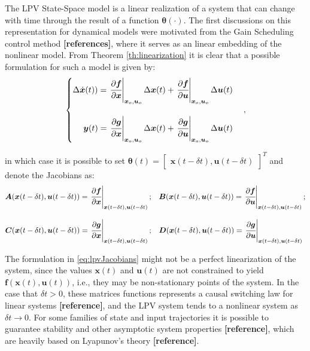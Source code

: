 \documentclass[a4paper,11pt]{book}
\numberwithin{figure}{chapter}
\numberwithin{equation}{chapter}
\numberwithin{table}{chapter}
\theoremstyle{definition}
\begin{document}
The LPV State-Space model is a linear realization of a system that can change with time through the result of a function $\bm{\theta}(\cdot)$. The first discussions on this representation for dynamical models were motivated from the Gain Scheduling control method \textbf{[references]}, where it serves as an linear embedding of the nonlinear model. From Theorem \ref{th:linearization} it is clear that a possible formulation for such a model is given by: 
\begin{equation}
\begin{cases}
        \Delta \dot{\bm{x}}(t)) =\left. \cfrac{\partial \bm{f}}{\partial \bm{x}}\right\vert_{\bm{x}_o, \bm{u}_o} \Delta \bm{x}(t) + \left. \cfrac{\partial \bm{f}}{\partial \bm{u}}\right\vert_{\bm{x}_o,  \bm{u}_o}  \Delta \bm{u}(t) \\ \\
        \hfill \bm{y}(t) = \left. \cfrac{\partial \bm{g}}{\partial \bm{x}}\right\vert_{\bm{x}_o, \bm{u}_o} \Delta \bm{x}(t) + \left. \cfrac{\partial \bm{g}}{\partial \bm{u}}\right\vert_{\bm{x}_o, \bm{u}_o} \Delta \bm{u}(t) \\
\end{cases}
,\end{equation}

\noindent in which case it is possible to set $\bm{\theta}(t) = \begin{bmatrix} \bm{x}(t-\delta t), \bm{u}(t-\delta t) \end{bmatrix}^T$ and denote the Jacobians as:
\begin{align} \label{eq:lpvJacobians}
\begin{matrix*}[l]
        \bm{A}(\bm{x}(t-\delta t), \bm{u}(t-\delta t)) = \left. \cfrac{\partial \bm{f}}{\partial \bm{x}}\right\vert_{\bm{x}(t-\delta t), \bm{u}(t-\delta t)}; & \bm{B}(\bm{x}(t-\delta t), \bm{u}(t-\delta t)) = \left. \cfrac{\partial \bm{f}}{\partial \bm{u}}\right\vert_{\bm{x}(t-\delta t), \bm{u}(t-\delta t)}; \\ \\ \bm{C}(\bm{x}(t-\delta t), \bm{u}(t-\delta t)) = \left. \cfrac{\partial \bm{g}}{\partial \bm{x}}\right\vert_{\bm{x}(t-\delta t), \bm{u}(t-\delta t)} ; & \bm{D}(\bm{x}(t-\delta t), \bm{u}(t-\delta t)) = \left. \cfrac{\partial \bm{g}}{\partial \bm{u}}\right\vert_{\bm{x}(t-\delta t), \bm{u}(t-\delta t)} 
\end{matrix*}
\end{align}

The formulation in \eqref{eq:lpvJacobians} might not be a perfect linearization of the system, since the values $\bm{x}(t)$ and $\bm{u}(t)$ are not constrained to yield $\bm{f}(\bm{x}(t), \bm{u}(t))$, i.e., they may be non-stationary points of the system. In the case that $\delta t > 0$, these matrices functions represents a causal switching law for linear systems \textbf{[reference]}, and the LPV system tends to a nonlinear system as $\delta t \to 0$. For some families of state and input trajectories it is possible to guarantee stability and other asymptotic system properties \textbf{[reference]}, which are heavily based on Lyapunov's theory \textbf{[reference]}. 
\end{document}
